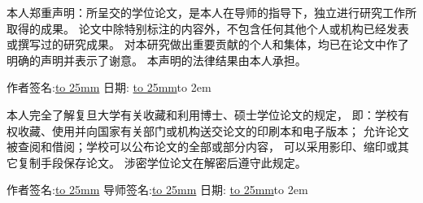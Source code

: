 \cleardoublepage
\pagestyle{empty}
\vspace{3.5cm}

\centerline{ }

\vspace{0.5cm}

\centerline{ }

\vspace{1cm}

本人郑重声明：所呈交的学位论文，是本人在导师的指导下，独立进行研究工作所取得的成果。
论文中除特别标注的内容外，不包含任何其他个人或机构已经发表或撰写过的研究成果。
对本研究做出重要贡献的个人和集体，均已在论文中作了明确的声明并表示了谢意。
本声明的法律结果由本人承担。

\vspace{2cm}

\hfill 作者签名:\underline{\hbox to 25mm{}}
\quad 日期: \underline{\hbox to 25mm{}}\hbox to 2em{}

\vspace{3cm}

\centerline{ }

\vspace{0.5cm}

\centerline{ }

\vspace{1cm}

本人完全了解复旦大学有关收藏和利用博士、硕士学位论文的规定，
即：学校有权收藏、使用并向国家有关部门或机构送交论文的印刷本和电子版本；
允许论文被查阅和借阅；学校可以公布论文的全部或部分内容，
可以采用影印、缩印或其它复制手段保存论文。
涉密学位论文在解密后遵守此规定。


\vspace{2cm}

\hfill 作者签名:\underline{\hbox to 25mm{}}
\quad 导师签名:\underline{\hbox to 25mm{}}
\quad 日期: \underline{\hbox to 25mm{}}\hbox to 2em{}
